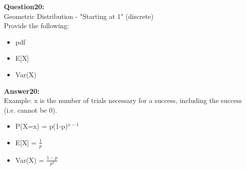 \documentclass{article}
\begin{document}
\textbf{Question20:} \\
Geometric Distribution - "Starting at 1" (discrete)\\
Provide the following:
\begin{itemize}
	\item pdf
	\item E[X]
	\item Var(X)
\end{itemize}

\textbf{Answer20:} \\
Example: x is the number of trials necessary for a success, including the success (i.e. cannot be 0).
\begin{itemize}
	\item P(X=x) = p(1-p)$^{x - 1}$
	\item E[X] = $\frac{1}{p}$
	\item Var(X) = $\frac{1 - p}{p^2}$
\end{itemize}
\end{document}
